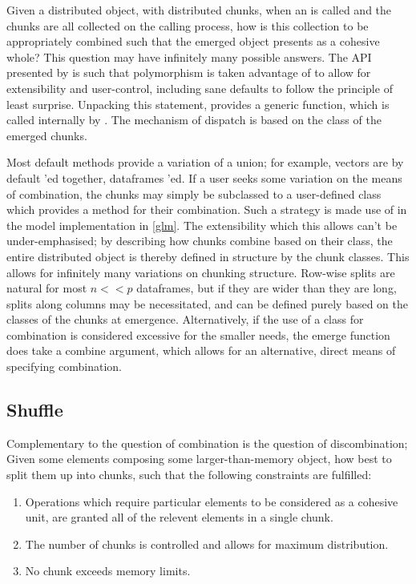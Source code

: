 Given a distributed object, with distributed chunks, when an  is called and the chunks are all collected on the calling process, how is this collection to be appropriately combined such that the emerged object presents as a cohesive whole?
This question may have infinitely many possible answers.
The API presented by \lsr is such that polymorphism is taken advantage of to allow for extensibility and user-control, including sane defaults to follow the principle of least surprise.
Unpacking this statement, \lsr provides a generic  function, which is called internally by .
The mechanism of dispatch is based on the class of the emerged chunks.

Most default  methods provide a variation of a union; for example, vectors are by default 'ed together, dataframes 'ed.
If a user seeks some variation on the means of combination, the chunks may simply be subclassed to a user-defined class which provides a  method for their combination.
Such a strategy is made use of in the model implementation in \cref{glm}.
The extensibility which this allows can't be under-emphasised; by describing how chunks combine based on their class, the entire distributed object is thereby defined in structure by the chunk classes.
This allows for infinitely many variations on chunking structure.
Row-wise splits are natural for most $n<<p$ dataframes, but if they are wider than they are long, splits along columns may be necessitated, and can be defined purely based on the classes of the chunks at emergence.
Alternatively, if the use of a class for combination is considered excessive for the smaller needs, the emerge function does take a combine argument, which allows for an alternative, direct means of specifying combination.

\subsection{Shuffle}\label{sec:shuffle}

Complementary to the question of combination is the question of discombination;
Given some elements composing some larger-than-memory object, how best to split them up into chunks, such that the following constraints are fulfilled:

\begin{enumerate}
\item Operations which require particular elements to be considered as a cohesive unit, are granted all of the relevent elements in a single chunk.
\item The number of chunks is controlled and allows for maximum distribution.
\item No chunk exceeds memory limits.
\end{enumerate}

